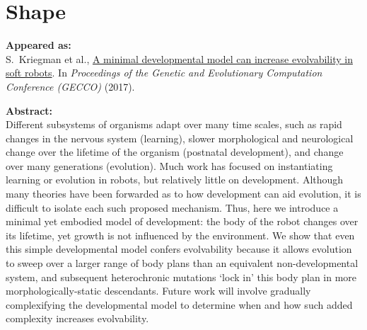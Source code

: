 

\chapter{Shape}

\textbf{Appeared as:}\\
S.~Kriegman et al., 
\href{https://dl.acm.org/doi/abs/10.1145/3071178.3071296}{\color{blue}A minimal developmental model can increase evolvability in soft robots}. In
\textit{Proceedings of the Genetic and Evolutionary Computation Conference (GECCO)} (2017).

\vspace{1em}

\noindent
\textbf{Abstract:}\\
\noindent
Different subsystems of organisms adapt over many time scales,
such as rapid changes in the nervous system (learning),
slower morphological and neurological change over the lifetime 
of the organism (postnatal development), and change over
many generations (evolution). Much work has
focused on instantiating learning or evolution in robots, but relatively
little on development. Although many theories have been
forwarded as to how development can aid evolution, it is difficult
to isolate each such proposed mechanism. Thus, here we introduce
a minimal yet embodied model of development: the body of the
robot changes over its lifetime, yet growth is not influenced
by the environment. We show that even this simple developmental
model confers
evolvability because it allows evolution to sweep over a larger
range of body plans than an equivalent non-developmental system,
and subsequent heterochronic mutations
`lock in' this body plan in more morphologically-static descendants.
Future work will involve gradually complexifying the developmental
model to determine when and how such added complexity increases
evolvability.










